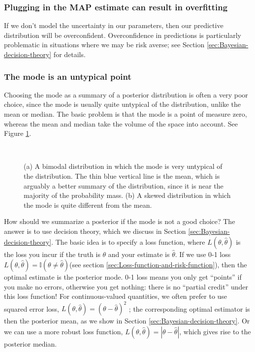 \subsubsection{Plugging in the MAP estimate can result in overfitting}
If we don’t model the uncertainty in our parameters, then our predictive distribution will be overconfident. Overconfidence in predictions is particularly problematic in situations where we may be risk averse; see Section \ref{sec:Bayesian-decision-theory} for details.

\subsubsection{The mode is an untypical point}
Choosing the mode as a summary of a posterior distribution is often a very poor choice, since the mode is usually quite untypical of the distribution, unlike the mean or median. The basic problem is that the mode is a point of measure zero, whereas the mean and median take the volume of the space into account. See Figure \ref{fig:untypical-point}.

\begin{figure}[hbtp]
\centering
{} \\
\caption{(a) A bimodal distribution in which the mode is very untypical of the distribution. The thin blue vertical line is the mean, which is arguably a better summary of the distribution, since it is near the majority of the probability mass. (b) A skewed distribution in which the mode is quite different from the mean.}
\label{fig:untypical-point} 
\end{figure}

How should we summarize a posterior if the mode is not a good choice? The answer is to use decision theory, which we discuss in Section \ref{sec:Bayesian-decision-theory}. The basic idea is to specify a loss function, where $L(\theta,\hat{\theta})$ is the loss you incur if the truth is $\theta$ and your estimate is $\hat{\theta}$. If we use 0-1 loss $L(\theta,\hat{\theta})=\mathbb{I}(\theta \neq \hat{\theta})$(see section \ref{sec:Loss-function-and-risk-function}), then the optimal estimate is the posterior mode. 0-1 loss means you only get “points” if you make no errors, otherwise you get nothing: there is no “partial credit” under this loss function! For continuous-valued quantities, we often prefer to use squared error loss, $L(\theta,\hat{\theta})=(\theta-\hat{\theta})^2$ ; the corresponding optimal estimator is then the posterior mean, as we show in Section \ref{sec:Bayesian-decision-theory}. Or we can use a more robust loss function, $L(\theta,\hat{\theta})=|\theta-\hat{\theta}|$, which gives rise to the posterior median.

